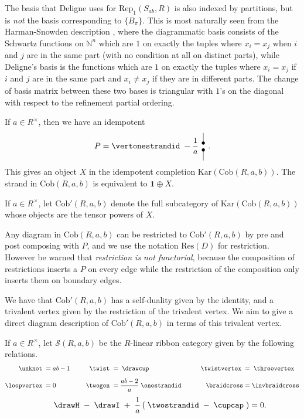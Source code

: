 \documentclass[12pt]{amsart}
\begin{document}
\begin{remark}
    The basis that Deligne uses for $\mathrm{Rep}_1(S_{ab},R)$ is also indexed by partitions, but is \emph{not} the basis corresponding to $\{B_\pi\}$. This is most naturally seen from the Harman-Snowden description \cite{2204.04526}, where the diagrammatic basis consists of the Schwartz functions on $\mathbb{N}^n$ which are $1$ on exactly the tuples where $x_i = x_j$ when $i$ and $j$ are in the same part (with no condition at all on distinct parts), while Deligne's basis is the functions which are $1$ on exactly the tuples where $x_i = x_j$ if $i$ and $j$ are in the same part and $x_i \neq x_j$ if they are in different parts. The change of basis matrix between these two bases is triangular with $1$'s on the diagonal with respect to the refinement partial ordering.
\end{remark}


If $a \in R^\times$, then we have an idempotent
\[P = \vertonestrandid \;- \frac{1}{a} \counitunit.\]
This gives an object $X$ in the idempotent completion $\mathrm{Kar}(\mathrm{Cob}(R,a,b))$. The strand in $\mathrm{Cob}(R,a,b)$ is equivalent to $\mathbf{1} \oplus X$.

\begin{definition}
    If $a \in R^\times$, let $\mathrm{Cob}'(R,a,b)$ denote the full subcategory of $\mathrm{Kar}(\mathrm{Cob}(R,a,b))$ whose objects are the tensor powers of $X$.
\end{definition}

Any diagram in $\mathrm{Cob}(R,a,b)$ can be restricted to $\mathrm{Cob}'(R,a,b)$ by pre and post composing with $P$, and we use the notation $\mathrm{Res}(D)$ for restriction. However be warned that \emph{restriction is not functorial}, because the composition of restrictions inserts a $P$ on every edge while the restriction of the composition only inserts them on boundary edges.

We have that $\mathrm{Cob}'(R,a,b)$ has a self-duality given by the identity, and a trivalent vertex given by the restriction of the trivalent vertex. We aim to give a direct diagram description of $\mathrm{Cob}'(R,a,b)$ in terms of this trivalent vertex.

\begin{definition}
If $a \in R^\times$, let $\mathcal{S}(R,a,b)$ be the $R$-linear ribbon category given by the following relations.
\begin{align*}
    \unknot\; &= ab-1 &\qquad
      \twist\; &=  \;\drawcup&\qquad
        \twistvertex\; &=  \;\threevertex\\[5pt] 
    \loopvertex\;&=0&
      \twogon\;&= \frac{ab-2}{a} \;\onestrandid & \braidcross &= \invbraidcross
\end{align*}
\vspace{5pt}
\[ \qquad  \drawH \; - \; \drawI \; +  \; \frac{1}{a}\left(\;\twostrandid \; -  \; \cupcap \; \right) = 0.\]
\end{definition}
\end{document}
